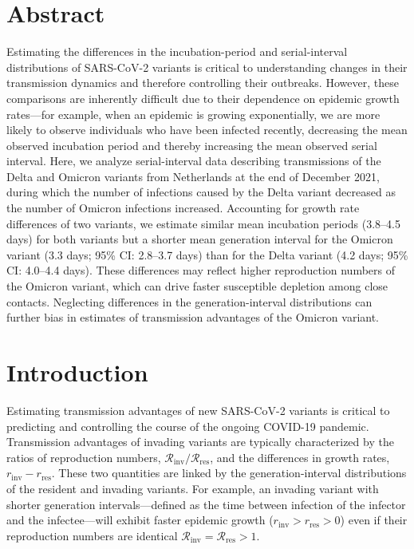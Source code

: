 \documentclass[12pt]{article}
\date{\today}
\newcommand{\Rx}[1]{\ensuremath{{\mathcal R}_{#1}}\xspace}
\newcommand{\Rres}{\Rx{\mathrm{res}}}
\newcommand{\Rinv}{\Rx{\mathrm{inv}}}
\newcommand{\rx}[1]{\ensuremath{{r}_{#1}}\xspace}
\newcommand{\rres}{\rx{\mathrm{res}}}
\newcommand{\rinv}{\rx{\mathrm{inv}}}
\begin{document}
\begin{flushleft}{
	\Large
	\textbf{}
}
\bigskip

\section*{Abstract}

Estimating the differences in the incubation-period and serial-interval distributions of SARS-CoV-2 variants is critical to understanding changes in their transmission dynamics and therefore controlling their outbreaks.
However, these comparisons are inherently difficult due to their dependence on epidemic growth rates---for example, when an epidemic is growing exponentially, we are more likely to observe individuals who have been infected recently, decreasing the mean observed incubation period and thereby increasing the mean observed serial interval.
Here, we analyze serial-interval data describing transmissions of the Delta and Omicron variants from Netherlands at the end of December 2021, during which the number of infections caused by the Delta variant decreased as the number of Omicron infections increased. 
Accounting for growth rate differences of two variants, we estimate similar mean incubation periods (3.8--4.5 days) for both variants but a shorter mean generation interval for the Omicron variant (3.3 days; 95\% CI: 2.8--3.7 days) than for the Delta variant (4.2 days; 95\% CI: 4.0--4.4 days).
These differences may reflect higher reproduction numbers of the Omicron variant, which can drive faster susceptible depletion among close contacts.
Neglecting differences in the generation-interval distributions can further bias in estimates of transmission advantages of the Omicron variant.

\end{flushleft}

\pagebreak

\section{Introduction}

Estimating transmission advantages of new SARS-CoV-2 variants is critical to predicting and controlling the course of the ongoing COVID-19 pandemic.
Transmission advantages of invading variants are typically characterized by the ratios of reproduction numbers, $\Rinv/\Rres$, and the differences in growth rates, $\rinv-\rres$.
These two quantities are linked by the generation-interval distributions of the resident and invading variants.
For example, an invading variant with shorter generation intervals---defined as the time between infection of the infector and the infectee---will exhibit faster epidemic growth ($\rinv > \rres > 0$) even if their reproduction numbers are identical  $\Rinv = \Rres > 1$.
\end{document}
